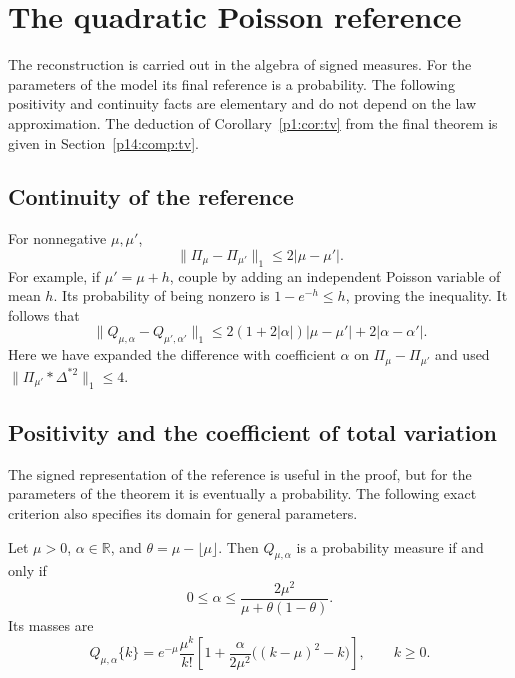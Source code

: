 \section{The quadratic Poisson reference}
\label{p14:reference:section}

The reconstruction is carried out in the algebra of signed measures.
For the parameters of the model its final reference is a probability.
The following positivity and continuity facts are elementary and do not
depend on the law approximation. The deduction of
Corollary~\ref{p1:cor:tv} from the final theorem is given in
Section~\ref{p14:comp:tv}.

\subsection{Continuity of the reference}

For nonnegative $\mu,\mu'$,
\begin{equation}
 \|\Pi_\mu-\Pi_{\mu'}\|_1\le2|\mu-\mu'|.
 \label{p1:close:poisson-lipschitz}
\end{equation}
For example, if $\mu'=\mu+h$, couple by adding an independent
Poisson variable of mean $h$.  Its probability of being nonzero
is $1-e^{-h}\le h$, proving the inequality.
It follows that
\begin{equation}
 \|Q_{\mu,\alpha}-Q_{\mu',\alpha'}\|_1
 \le2(1+2|\alpha|)|\mu-\mu'|+2|\alpha-\alpha'|.
 \label{p1:close:reference-lipschitz}
\end{equation}
Here we have expanded the difference with coefficient $\alpha$
on $\Pi_\mu-\Pi_{\mu'}$ and used
$\|\Pi_{\mu'}*\Delta^{*2}\|_1\le4$.

\subsection{Positivity and the coefficient of total variation}
\label{p1:close:positivity-section}

The signed representation of the reference is useful in the
proof, but for the parameters of the theorem it is eventually
a probability.  The following exact criterion also specifies
its domain for general parameters.

\begin{lemma}
\label{p1:close:positivity}
Let $\mu>0$, $\alpha\in\mathbb R$, and
$\theta=\mu-\lfloor\mu\rfloor$.  Then $Q_{\mu,\alpha}$ is a
probability measure if and only if
\begin{equation}
 0\le\alpha\le
       \frac{2\mu^2}{\mu+\theta(1-\theta)}.
 \label{p1:close:positivity-range}
\end{equation}
Its masses are
\begin{equation}
 Q_{\mu,\alpha}\{k\}
 =e^{-\mu}\frac{\mu^k}{k!}
   \left[1+\frac{\alpha}{2\mu^2}
                    \bigl((k-\mu)^2-k\bigr)\right],
 \qquad k\ge0.
 \label{p1:close:charlier-masses}
\end{equation}
\end{lemma}

